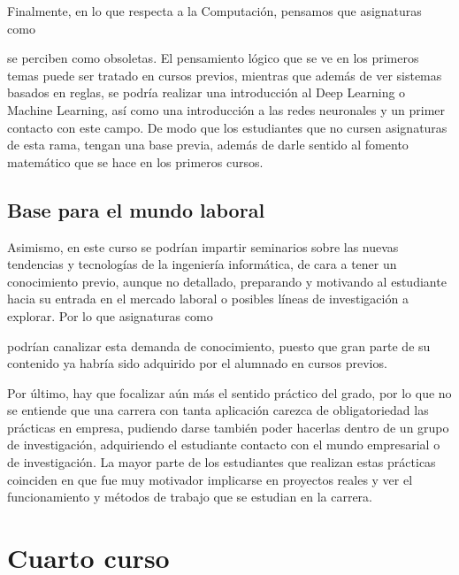 Finalmente, en lo que respecta a la Computación, pensamos que asignaturas como 
\subject{Sistemas inteligentes} se perciben como obsoletas. El pensamiento lógico que se ve 
en los primeros temas puede ser tratado en cursos previos, mientras que además de ver 
sistemas basados en reglas, se podría realizar una introducción al Deep Learning o Machine 
Learning, así como una introducción a las redes neuronales y un primer contacto con este 
campo. De modo que los estudiantes que no cursen asignaturas de esta rama, tengan una base previa, 
además de darle sentido al fomento matemático que se hace en los primeros cursos.


\subsection{Base para el mundo laboral}
Asimismo, en este curso se podrían impartir seminarios sobre las nuevas tendencias y 
tecnologías de la ingeniería informática, de cara a tener un conocimiento previo, aunque 
no detallado, preparando y motivando al estudiante hacia su entrada en el mercado laboral o 
posibles líneas de investigación a explorar. Por lo que asignaturas como 
\subject{Tecnologías Específicas de la Ingeniería Informática (TEII)} podrían canalizar 
esta demanda de conocimiento, puesto que gran parte de su contenido ya habría sido adquirido 
por el alumnado en cursos previos.

Por último, hay que focalizar aún más el sentido práctico del grado, por lo que no se 
entiende que una carrera con tanta aplicación carezca de obligatoriedad las prácticas en 
empresa, pudiendo darse también poder hacerlas dentro de un grupo de investigación, 
adquiriendo el estudiante contacto con el mundo empresarial o de investigación. La mayor parte 
de los estudiantes que realizan estas prácticas coinciden en que fue muy motivador implicarse en 
proyectos reales y ver el funcionamiento y métodos de trabajo que se estudian en la carrera.
\section{Cuarto curso}


